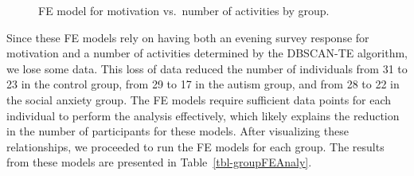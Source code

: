 \documentclass[
  letterpaper,
  number,
  review,
  3p]{elsarticle}
\begin{document}
\begin{figure}[H]


\caption{\label{fig-groupFE}FE model for motivation vs.~number of
activities by group.}

\end{figure}%

Since these FE models rely on having both an evening survey response for
motivation and a number of activities determined by the DBSCAN-TE
algorithm, we lose some data. This loss of data reduced the number of
individuals from 31 to 23 in the control group, from 29 to 17 in the
autism group, and from 28 to 22 in the social anxiety group. The FE
models require sufficient data points for each individual to perform the
analysis effectively, which likely explains the reduction in the number
of participants for these models. After visualizing these relationships,
we proceeded to run the FE models for each group. The results from these
models are presented in Table~\ref{tbl-groupFEAnaly}.

\begin{table}

\caption{\label{tbl-groupFEAnaly}FE Models: Motivation and Number of
Activities by Group}


\end{table}%
\end{document}
